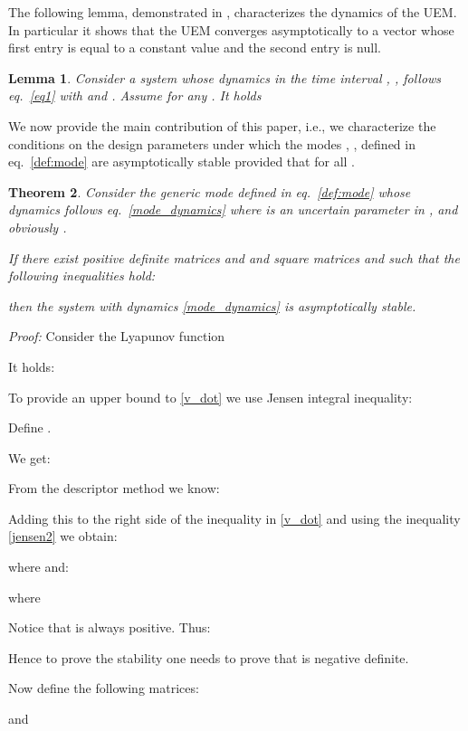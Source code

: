 \documentclass[conference]{IEEEtran}
\newtheorem{theorem}{\textbf{Theorem}}
\newtheorem{lemma}[theorem]{\textbf{Lemma}}
\begin{document}
The following lemma, demonstrated in \cite{ETFA2014}, characterizes the dynamics of the UEM. In particular it shows that the UEM converges asymptotically to a vector whose first entry  is equal to a constant value and the second entry  is null.

\begin{lemma}\label{lemma1}
Consider a system whose dynamics in the time interval , , follows eq.~\eqref{eq1} with  and . Assume  for any . It holds


\end{lemma}



We now provide the main contribution of this paper, i.e., we characterize the conditions on the design parameters  under which the modes , , defined in eq.~\eqref{def:mode} are asymptotically stable provided that  for all .

\begin{theorem}\label{new_theorem}
Consider the generic mode  defined in eq.~\eqref{def:mode} whose dynamics follows eq.~\eqref{mode_dynamics} where  is an uncertain parameter in , and obviously .

If there exist positive definite matrices  and  and square matrices  and  such that the following inequalities hold:




then the system with dynamics \eqref{mode_dynamics} is asymptotically stable.
\end{theorem}


{\em Proof:} Consider the Lyapunov function


It holds:


To provide an upper bound to \eqref{v_dot} we use Jensen integral inequality:

Define .

We get:

From the descriptor method  \cite{fridman2001descriptor} we know:

Adding this to the right side of the inequality in \eqref{v_dot} and using the inequality \eqref{jensen2} we obtain:

where  and:

where 

Notice that   is always positive. Thus:

Hence to prove the stability one needs to prove that  is negative definite.

Now define the following matrices:

and
\end{document}
